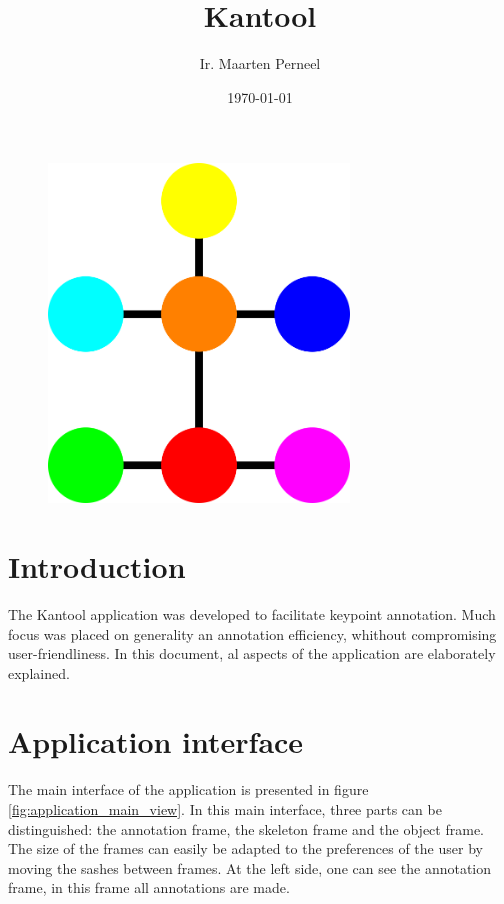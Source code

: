 \documentclass[a4paper, 11pt]{article}
\title{\bf{Kantool}}
\author{Ir. Maarten Perneel}
\date{\today}
\begin{document}
\maketitle
\thispagestyle{empty}

\begin{figure}[h]
	\centering
	\includegraphics[width=8cm]{Kantool_icon}
\end{figure}

\newpage

\tableofcontents
\newpage

\section{Introduction}
The Kantool application was developed to facilitate keypoint annotation. Much focus was placed on generality an annotation efficiency, whithout compromising user-friendliness. In this document, al aspects of the application are elaborately explained.

\section{Application interface}
The main interface of the application is presented in figure \ref{fig:application_main_view}. In this main interface, three parts can be distinguished: the annotation frame, the skeleton frame and the object frame. The size of the frames can easily be adapted to the preferences of the user by moving the sashes between frames. At the left side, one can see the annotation frame, in this frame all annotations are made.
\end{document}
